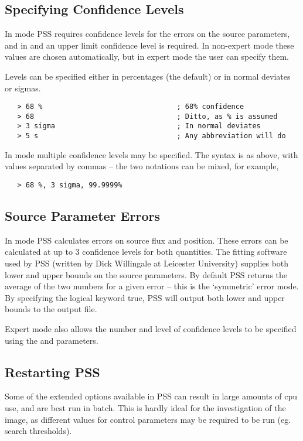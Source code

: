 \subsection{Specifying Confidence Levels}

In  mode PSS requires confidence levels for the errors
on the source parameters, and in  and  an upper
limit confidence level is required. In non-expert mode these values
are chosen automatically, but in expert mode the user can specify them.

Levels can be specified either in percentages (the default) or in normal
deviates or sigmas. 
\begin{verbatim}
   > 68 %                                ; 68% confidence
   > 68                                  ; Ditto, as % is assumed
   > 3 sigma                             ; In normal deviates
   > 5 s                                 ; Any abbreviation will do
\end{verbatim}
In  mode multiple confidence levels may be specified. The
syntax is as above, with values separated by commas -- the two notations
can be mixed, for example,
\begin{verbatim}
   > 68 %, 3 sigma, 99.9999%
\end{verbatim}


\subsection{Source Parameter Errors}

In  mode PSS calculates errors on source flux and position.
These errors can be calculated at up to 3 confidence levels for both
quantities. The fitting software used by PSS (written by Dick Willingale at
Leicester University) supplies both lower and upper bounds on the source
parameters. By default PSS returns the average of the two numbers for a
given error -- this is the `symmetric' error mode. By specifying the
 logical keyword true, PSS will output both lower and
upper bounds to the output file.

Expert mode also allows the number and level of confidence levels to be
specified using the  and  parameters. 

\subsection{Restarting PSS}
Some of the extended options available in PSS can result in large amounts
of cpu use, and are best run in batch. This is hardly ideal for the
investigation of the image, as different values for control parameters
may be required to be run (eg. search thresholds).

